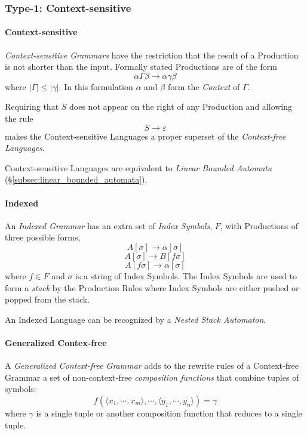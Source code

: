 \documentclass{article}
\begin{document}
\subsubsection{Type-1: Context-sensitive}

\paragraph{Context-sensitive}\label{subsec:context_sensitive}
\emph{Context-sensitive Grammars} have the restriction that the result
of a Production is not shorter than the input. Formally stated
Productions are of the form
\[
    \alpha \Gamma \beta \rightarrow \alpha \gamma \beta
\]
where $|\Gamma| \leq |\gamma|$. In this formulation $\alpha$ and $\beta$ form
the \emph{Context} of $\Gamma$.

Requiring that $S$ does not appear on the right of any Production
and allowing the rule
\[
    S \rightarrow \varepsilon
\]
makes the Context-sensitive Languages a proper superset of the
\emph{Context-free Languages}.

Context-sensitive Languages are equivalent to \emph{Linear
Bounded Automata} (\S\ref{subsec:linear_bounded_automata}).

\paragraph{Indexed}
An \emph{Indexed Grammar} has an extra set of \emph{Index Symbols},
$F$, with Productions of three possible forms,
\[
    A[\sigma] \rightarrow \alpha[\sigma]
\]\[
    A[\sigma] \rightarrow B[f\sigma]
\]\[
    A[f\sigma] \rightarrow \alpha[\sigma]
\]
where $f \in F$ and $\sigma$ is a string of Index Symbols. The Index
Symbols are used to form a \emph{stack} by the Production Rules where
Index Symbols are either pushed or popped from the stack.

An Indexed Language can be recognized by a \emph{Nested Stack
  Automaton}\cite{aho69}.

\paragraph{Generalized Contex-free}
A \emph{Generalized Context-free Grammar} adds to the rewrite rules of
a Context-free Grammar a set of non-context-free \emph{composition
  functions} that combine tuples of symbols:
\[
    f(\langle x_1,\cdots,x_m\rangle,\cdots,\langle
    y_1,\cdots,y_n\rangle)=\gamma
\]
where $\gamma$ is a single tuple or another composition function that
reduces to a single tuple.
\end{document}

